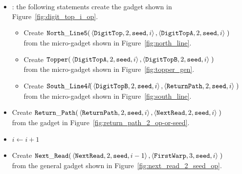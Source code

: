 \begin{itemize}
    \item {\dtop}: the following statements create the gadget shown in Figure~\ref{fig:digit_top_i_op}.
    \begin{itemize}
        \item Create
        $\begin{aligned}[t]
            {\tt North\_Line5}(& \left \langle {\tt DigitTop},  2, {\tt seed} , i \right\rangle,
                                 \left \langle {\tt DigitTopA}, 2, {\tt seed} , i \right\rangle \;)
        \end{aligned}$\\ from the micro-gadget shown in Figure~\ref{fig:north_line}.

        \item Create
        $\begin{aligned}[t]
            {\tt Topper}(& \left \langle {\tt DigitTopA}, 2, {\tt seed}, i \right\rangle,
                           \left \langle {\tt DigitTopB}, 2, {\tt seed}, i \right\rangle \;)
        \end{aligned}$\\ from the micro-gadget shown in Figure~\ref{fig:topper_gen}.

        \item Create
        $\begin{aligned}[t]
            {\tt South\_Line4\textit{l}}(&\left\langle {\tt DigitTopB},  2, {\tt seed}, i \right\rangle,
                                          \left\langle {\tt ReturnPath}, 2, {\tt seed}, i \right\rangle \;)
        \end{aligned}$\\ from the micro-gadget shown in Figure~\ref{fig:south_line}.
    \end{itemize}


    \item Create
    $\begin{aligned}[t]
        {\tt Return\_Path}(&\left\langle {\tt ReturnPath}, 2, {\tt seed}, i \right\rangle,
                     \left\langle {\tt NextRead},   2, {\tt seed}, i \right\rangle \;)
    \end{aligned}$\\ from the gadget in Figure~\ref{fig:return_path_2_op-or-seed}.

    \item $i \gets i + 1$

    \item Create
    $\begin{aligned}[t]
        {\tt Next\_Read}(&\left\langle {\tt NextRead},  2, {\tt seed}, i - 1 \right\rangle,
                   \left\langle {\tt FirstWarp}, 3, {\tt seed}, i     \right\rangle \;)
    \end{aligned}$\\ from the general gadget shown in Figure~\ref{fig:next_read_2_seed_op}.


\end{itemize}
